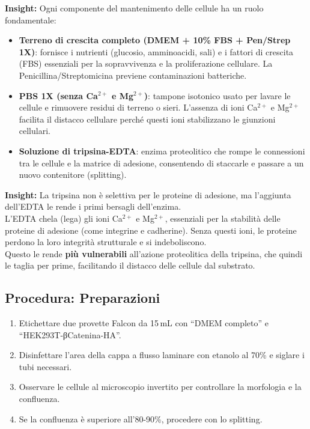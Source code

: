 \begin{insightBox}
  \textbf{Insight:} Ogni componente del mantenimento delle cellule ha un ruolo fondamentale:
  \begin{itemize}\footnotesize
    \item \textbf{Terreno di crescita completo (DMEM + 10\% FBS + Pen/Strep 1X)}: fornisce i nutrienti (glucosio, amminoacidi, sali) e i fattori di crescita (FBS) essenziali per la sopravvivenza e la proliferazione cellulare. La Penicillina/Streptomicina previene contaminazioni batteriche.
    \item \textbf{PBS 1X (senza Ca$^{2+}$ e Mg$^{2+}$)}: tampone isotonico usato per lavare le cellule e rimuovere residui di terreno o sieri. L’assenza di ioni Ca$^{2+}$ e Mg$^{2+}$ facilita il distacco cellulare perché questi ioni stabilizzano le giunzioni cellulari.
    \item \textbf{Soluzione di tripsina-EDTA}: enzima proteolitico che rompe le connessioni tra le cellule e la matrice di adesione, consentendo di staccarle e passare a un nuovo contenitore (splitting).
  \end{itemize}
\end{insightBox}

\begin{insightBox}
  \textbf{Insight:} La tripsina non è selettiva per le proteine di adesione, ma l’aggiunta dell’EDTA le rende i primi bersagli dell’enzima.\\
  L’EDTA chela (lega) gli ioni Ca$^{2+}$ e Mg$^{2+}$, essenziali per la stabilità delle proteine di adesione (come integrine e cadherine). Senza questi ioni, le proteine perdono la loro integrità strutturale e si indeboliscono.\\
  Questo le rende \textbf{più vulnerabili} all’azione proteolitica della tripsina, che quindi le taglia per prime, facilitando il distacco delle cellule dal substrato.
\end{insightBox}


\newpage

\subsection{Procedura: Preparazioni}

\begin{enumerate}\footnotesize
  \item Etichettare due provette Falcon da 15\,mL con “DMEM completo” e “HEK293T-βCatenina-HA”.
  \item Disinfettare l’area della cappa a flusso laminare con etanolo al 70\% e siglare i tubi necessari.
  \item Osservare le cellule al microscopio invertito per controllare la morfologia e la confluenza.
  \item Se la confluenza è superiore all’80-90\%, procedere con lo splitting.
\end{enumerate}

